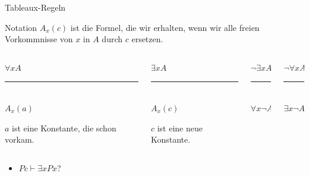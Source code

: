\documentclass[12pt]{beamer}
\newcommand{\prule}{\vspace{-8pt}\rule{50pt}{0.5pt}}
\begin{document}
\begin{frame}{Tableaux-Regeln}

\begin{block}{Notation}
  $A_x(c)$ ist die Formel, die wir erhalten, wenn wir alle freien
  Vorkommnisse von $x$ in $A$ durch $c$ ersetzen.
\end{block}
\pause
\begin{columns}

  \begin{column}[t]{.25 \linewidth}
    \begin{center}
      $\forall x A$ \\
      \prule\\
      $A_x(a)$
    \end{center}
    $a$ ist eine Konstante, die schon vorkam.
  \end{column}
  \pause
  \begin{column}[t]{.25 \linewidth}
    \begin{center}
      $\exists x A$ \\
      \prule\\
      $A_x(c)$
    \end{center}
    $c$ ist eine neue Konstante.
  \end{column}
  \pause
  \begin{column}[t]{.25 \linewidth}
    \begin{center}
      $\neg \exists x A$\\
      \prule\\
      $\forall x \neg A$\\
    \end{center}
  \end{column}
  \pause
  \begin{column}[t]{.25 \linewidth}
    \begin{center}
      $\neg \forall x A$ \\
      \prule\\
      $\exists x \neg A$
    \end{center}
  \end{column}
\end{columns}

\vspace{1em}
\begin{columns}

  \pause

  \begin{column}[t]{.5 \linewidth}
    \begin{itemize}[<+->]
    \item $Pc \vdash \exists x Px$?
    \end{itemize}
  \end{column}


\end{columns}
\end{frame}
\end{document}
